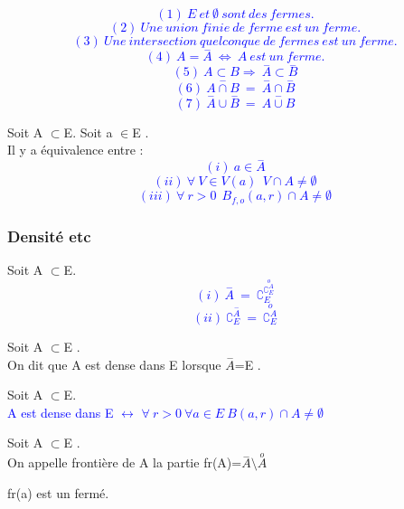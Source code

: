 \documentclass{article}
\begin{document}
\begin{theo}
\textcolor{blue}{
\[(1) \  E\ et\ \emptyset \ sont\ des\ fermes. \]
\[(2) \ Une\ union\ finie\ de\ ferme\ est\ un\ ferme. \]
\[(3) \  Une\ intersection\ quelconque\ de\ fermes\ est\ un\ ferme. \]
\[ (4) \ A=\overset{-}{A}\ \Leftrightarrow \ A\ est\ un\ ferme.\]
\[(5) \ A\subset B \Rightarrow \ \overset{-}{A}\subset\overset{-}{B} \]
\[(6) \ \overset{-}{A\cap B} \ = \ \overset{-}{A}\cap \overset{-}{B} \]
\[(7) \ \overset{-}{A}\cup \overset{-}{B} \ = \ \overset{-}{A\cup B} \]}

\end{theo}

\begin{theo}
 Soit A $\subset$E. Soit a $\in$E .\\
 Il y a équivalence entre :
 \textcolor{blue}{
\[ (i) \ a\in \overset{-}{A} \]
\[(ii) \ \forall \ V\in V(a) \ \ V\cap A \ne \emptyset\]
\[(iii) \ \forall \ r>0 \ \ B_{f,o}(a,r)\cap A \ne \emptyset\]}


\end{theo}

\subsubsection{Densité etc}



\begin{theo}

 Soit A $\subset$E. 
 \textcolor{blue}{
 \[(i) \  \overset{-}{A}\ =\ \complement_{E}^{\overset{o}{\complement_{E}^{A}}} \]
  \[(ii) \  \complement_{E}^{\overset{-}{A}}\ =\ \overset{o}{\complement_{E}^{A}} \]
 }


\end{theo}

\begin{defi}

Soit A $\subset$E . \\
On dit que A est dense dans E lorsque $\overset{-}{A}$=E .

\end{defi}


\begin{theo}

 Soit A $\subset$E. \\
 \textcolor{blue}{
 A est dense dans E $\leftrightarrow$ $\forall \  r>0\ \forall a \in E\ B(a,r)\cap A \ne \emptyset$  
 }


\end{theo}

\begin{defi}

Soit A $\subset$E . \\
On appelle frontière de A la partie fr(A)=$\overset{-}{A} \setminus \overset{o}{A}$

\end{defi}

\begin{theo}

 fr(a) est un fermé.

\end{theo}
\end{document}
